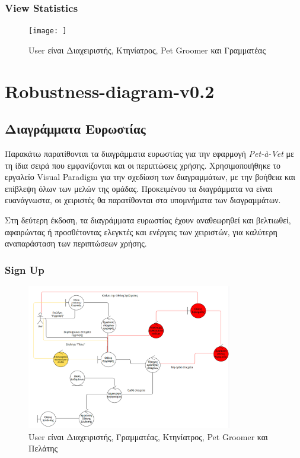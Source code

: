 \documentclass[12pt,a4paper,twoside]{book}
\begin{document}
\subsection{View Statistics}
\begin{figure}[H]
    \centering
    \texttt{[image: ]}
    \caption{User είναι Διαχειριστής, Κτηνίατρος, Pet Groomer και Γραμματέας}\label{fig:sequence-view-statistics}
\end{figure}

\chapter{Robustness-diagram-v0.2}

\section{Διαγράμματα Ευρωστίας}

Παρακάτω παρατίθονται τα διαγράμματα ευρωστίας για την εφαρμογή \textit{Pet-à-Vet} με τη ίδια σειρά που εμφανίζονται και οι περιπτώσεις χρήσης. Χρησιμοποιήθηκε το εργαλείο Visual Paradigm για την σχεδίαση των διαγραμμάτων, με την βοήθεια και επίβλεψη όλων των μελών της ομάδας. Προκειμένου τα διαγράμματα να είναι ευανάγνωστα, οι χειριστές θα παρατίθονται στα υπομνήματα των διαγραμμάτων. %

Στη δεύτερη έκδοση, τα διαγράμματα ευρωστίας έχουν αναθεωρηθεί και βελτιωθεί, αφαιρώντας ή προσθέτοντας ελεγκτές και ενέργεις των χειριστών, για καλύτερη αναπαράσταση των περιπτώσεων χρήσης. %

\subsection{Sign Up}
\begin{figure}[H]
    \centering
    \includegraphics[width=0.8\textwidth]{Resources/Robustness Diagram/SignUp.png}
    \caption{User είναι Διαχειριστής, Γραμματέας, Κτηνίατρος, Pet Groomer και Πελάτης}\label{fig:robustness-signup}
\end{figure}
\end{document}
